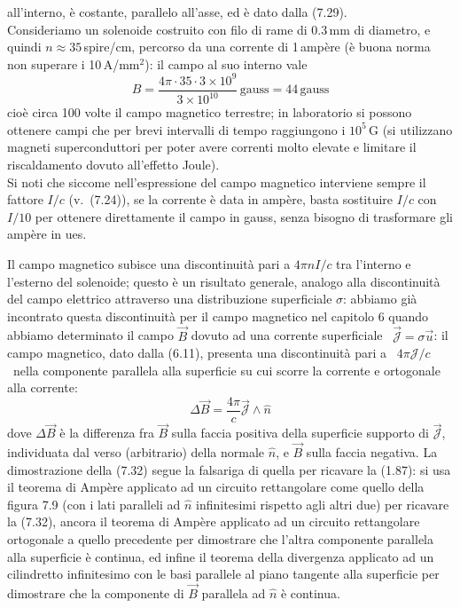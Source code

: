 all'interno, \`e costante, parallelo all'asse, ed \`e dato dalla (7.29).\\
Consideriamo un solenoide costruito con filo di rame di 0.3\,mm di diametro, e
quindi $n\approx35$\,spire/cm, percorso da una corrente di 1\,amp\`ere (\`e
buona norma non superare i 10\,A/mm$^2$): il campo al suo interno vale
\[
  B=\frac{4\pi\cdot35\cdot3\times10^9}{3\times10^{10}}\,\mathrm{gauss}
  =44\,\mathrm{gauss}
\]
cio\`e circa 100 volte il campo magnetico terrestre; in laboratorio si possono
ottenere campi che per brevi intervalli di tempo raggiungono i $10^5$\,G (si
utilizzano magneti superconduttori per poter avere correnti molto elevate e
limitare il riscaldamento dovuto all'effetto Joule).\\
Si noti che siccome nell'espressione del campo magnetico interviene sempre il
fattore $I/c$ \big(v.\ (7.24)\big), se la corrente \`e data in amp\`ere, basta
sostituire $I/c$ con $I/10$ per ottenere direttamente il campo in gauss, senza
bisogno di trasformare gli amp\`ere in ues.

Il campo magnetico subisce una discontinuit\`a pari a $4\pi nI/c$ tra l'interno
e l'esterno del solenoide; questo \`e un risultato generale, analogo alla
discontinuit\`a del campo elettrico attraverso una distribuzione superficiale
$\sigma$: abbiamo gi\`a incontrato questa discontinuit\`a per il campo magnetico
nel capitolo 6 quando abbiamo determinato il campo $\vec B$ dovuto ad una
corrente superficiale \ $\vec{\mathcal J}=\sigma\vec u$: il campo magnetico,
dato dalla (6.11), presenta una discontinuit\`a pari a \ $4\pi\mathcal J/c$
\ nella componente parallela alla superficie su cui scorre la corrente e
ortogonale alla corrente:
\begin{equation}
  \Delta\vec B=\frac{4\pi}{c}\vec{\mathcal J}\wedge\hat n
  \tag{7.32}
\end{equation}
dove $\Delta\vec B$ \`e la differenza fra $\vec B$ sulla faccia positiva della
superficie supporto di $\vec{\mathcal J}$, individuata dal verso (arbitrario)
della normale $\hat n$, e $\vec B$ sulla faccia negativa.
La dimostrazione della (7.32) segue la falsariga di quella per ricavare la
(1.87): si usa il teorema di Amp\`ere applicato ad un circuito rettangolare come
quello della figura 7.9 (con i lati paralleli ad $\hat n$ infinitesimi rispetto
agli altri due) per ricavare la (7.32), ancora il teorema di Amp\`ere applicato
ad un circuito rettangolare ortogonale a quello precedente per dimostrare che
l'altra componente parallela alla superficie \`e continua, ed infine il teorema
della divergenza applicato ad un cilindretto infinitesimo con le basi parallele
al piano tangente alla superficie per dimostrare che la componente di $\vec B$
parallela ad $\hat n$ \`e continua.

